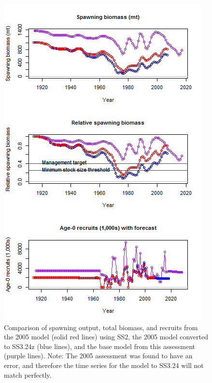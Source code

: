 \documentclass[12pt,]{article}
\begin{document}
\begin{figure}[htbp]
\centering
\includegraphics{Figures/bridge_timeseries.png}
\caption{Comparison of spawning output, total biomass, and recruits from
the 2005 model (solid red lines) using SS2, the 2005 model converted to
SS3.24z (blue lines), and the base model from this assessment (purple
lines). Note: The 2005 assessment was found to have an error, and
therefore the time series for the model to SS3.24 will not match
perfectly. \label{fig:bridge_timeseries}}
\end{figure}

\FloatBarrier

\FloatBarrier

\FloatBarrier
\end{document}
